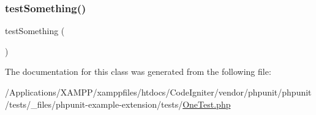 \mbox{\label{class_one_test_a0fc4e17369bc9607ebdd850d9eda8167}} 
\subsubsection{\texorpdfstring{test\+Something()}{testSomething()}}
{\footnotesize\ttfamily test\+Something (\begin{DoxyParamCaption}{ }\end{DoxyParamCaption})}



The documentation for this class was generated from the following file\+:\begin{DoxyCompactItemize}
\item 
/\+Applications/\+X\+A\+M\+P\+P/xamppfiles/htdocs/\+Code\+Igniter/vendor/phpunit/phpunit/tests/\+\_\+files/phpunit-\/example-\/extension/tests/\mbox{\hyperlink{__files_2phpunit-example-extension_2tests_2_one_test_8php}{One\+Test.\+php}}\end{DoxyCompactItemize}
